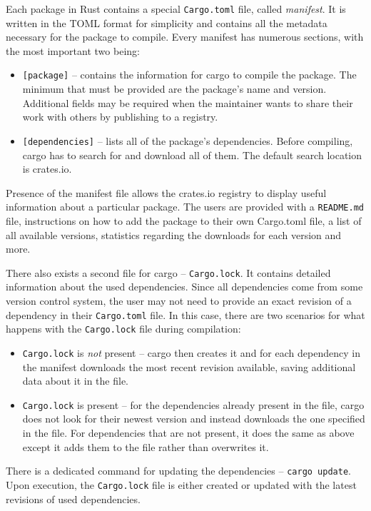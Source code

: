 \documentclass[licencjacka,en]{pracamgr}
\begin{document}
Each package in Rust contains a special \texttt{Cargo.toml} file, called \textit{manifest}. It is
written in the TOML format for simplicity and contains all the metadata necessary for the package
to compile. Every manifest has numerous sections, with the most important two being:
\begin{itemize}
	\item \texttt{[package]} -- contains the information for cargo to compile the package.
		The minimum that must be provided are the package's name and version. Additional fields
		may be required when the maintainer wants to share their work with others by publishing
		to a registry.
	\item \texttt{[dependencies]} -- lists all of the package's dependencies. Before compiling,
		cargo has to search for and download all of them. The default search location is crates.io.
\end{itemize}
Presence of the manifest file allows the crates.io registry to display useful information about
a particular package. The users are provided with a \texttt{README.md} file, instructions on how to add
the package to their own Cargo.toml file, a list of all available versions, statistics regarding
the downloads for each version and more.

There also exists a second file for cargo -- \texttt{Cargo.lock}. It contains detailed
information about the used dependencies. Since all dependencies come from some version control
system, the user may not need to provide an exact revision of a dependency in their
\texttt{Cargo.toml} file. In this case, there are two scenarios for what happens with the
\texttt{Cargo.lock} file during compilation:
\begin{itemize}
	\item \texttt{Cargo.lock} is \textit{not} present -- cargo then creates it and for each
		dependency in the manifest downloads the most recent revision available, saving additional
		data about it in the file.
	\item \texttt{Cargo.lock} is present -- for the dependencies already present in the file, cargo
		does not look for their newest version and instead downloads the one specified in the file.
		For dependencies that are not present, it does the same as above except it adds them to
		the file rather than overwrites it.
\end{itemize}
There is a dedicated command for updating the dependencies -- \texttt{cargo update}.
Upon execution, the \texttt{Cargo.lock} file is either created or updated with the latest
revisions of used dependencies.
\end{document}
